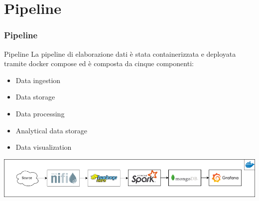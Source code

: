 \documentclass[13pt,aspectratio=169,t,xcolor=table]{beamer}
\begin{document}
\section{Pipeline}
\begin{frame}{}
    \frametitle{Pipeline}
\end{frame}

\begin{frame}{Pipeline}
    La pipeline di elaborazione dati è stata containerizzata e deployata tramite docker compose ed è composta da cinque componenti:
    \begin{itemize}
        \item Data ingestion
        \item Data storage
        \item Data processing
        \item Analytical data storage
        \item Data visualization
    \end{itemize}
    \begin{adjustbox}{margin=0.5cm 0cm 0cm 0.58cm, center} %
        \includegraphics[width=.99\textwidth]{res/pipeline.png}
    \end{adjustbox}
\end{frame}
\end{document}
